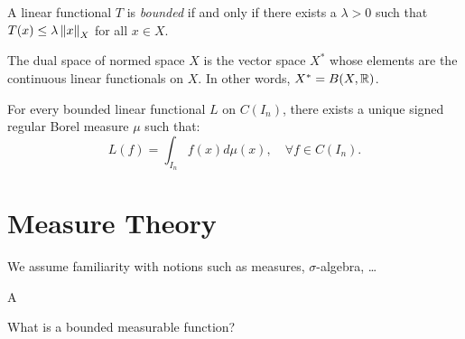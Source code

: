 A linear functional $T$ is \textit{bounded} if and only if there exists a $\lambda >
0$ such that $T(x) \leq \lambda \left\| x \right\|_{X}$ for all $x \in X$.

\begin{definition}
   The dual space of normed space $X$ is the vector space $X^*$ whose elements
   are the continuous linear functionals on $X$. In other words, $X^* = B(X,
   \mathbb{R})$.
\end{definition}

\begin{theorem}
   For every bounded linear functional $L$ on $C(I_n)$, there exists a unique
   signed regular Borel measure $\mu$ such that:
   \begin{equation*}
      L(f) = \int_{I_n} f(x) d\mu(x), \quad \forall f \in C(I_n).
   \end{equation*}
\end{theorem}

\section{Measure Theory}

We assume familiarity with notions such as measures, $\sigma$-algebra, \dots

\begin{definition}
   A 
\end{definition}

\begin{definition}
   
\end{definition}

What is a bounded measurable function?

\begin{definition}
   
\end{definition}

